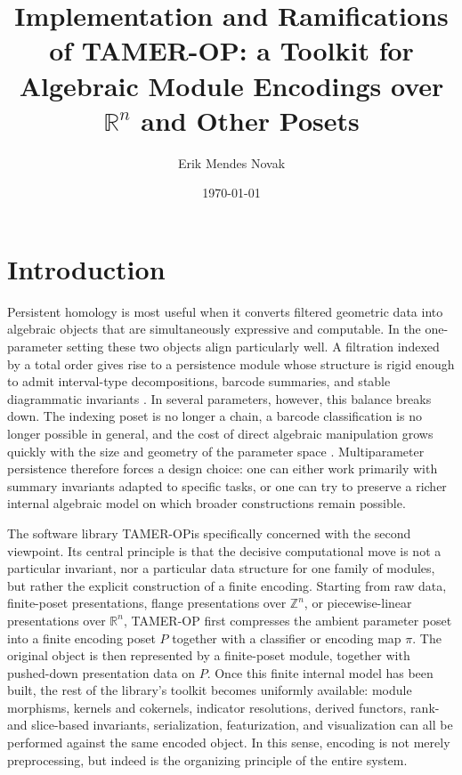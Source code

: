 \documentclass[11pt]{article}
\title{Implementation and Ramifications of TAMER-OP: a Toolkit for Algebraic Module Encodings over $\mathbb{R}^n$ and Other Posets}
\author{Erik Mendes Novak}
\date{\today}
\newcommand{\R}{\mathbb{R}}
\newcommand{\Z}{\mathbb{Z}}
\newcommand{\TAMER}{\textsc{TAMER-OP}}
\theoremstyle{definition}
\theoremstyle{remark}
\begin{document}
\maketitle
\tableofcontents



\section{Introduction}\label{sec:introduction}

Persistent homology is most useful when it converts filtered geometric data into algebraic objects that are simultaneously expressive and computable. In the one-parameter setting these two objects align particularly well. A filtration indexed by a total order gives rise to a persistence module whose structure is rigid enough to admit interval-type decompositions, barcode summaries, and stable diagrammatic invariants \cite{ELZ02,CEH07,CB15,EH10}. In several parameters, however, this balance breaks down. The indexing poset is no longer a chain, a barcode classification is no longer possible in general, and the cost of direct algebraic manipulation grows quickly with the size and geometry of the parameter space \cite{CZ09,Les15,CDSGO16,Oud15}. Multiparameter persistence therefore forces a design choice: one can either work primarily with summary invariants adapted to specific tasks, or one can try to preserve a richer internal algebraic model on which broader constructions remain possible.

The software library \TAMER is specifically concerned with the second viewpoint. Its central principle is that the decisive computational move is not a particular invariant, nor a particular data structure for one family of modules, but rather the explicit construction of a finite encoding. Starting from raw data, finite-poset presentations, flange presentations over $\Z^n$, or piecewise-linear presentations over $\R^n$, \TAMER{} first compresses the ambient parameter poset into a finite encoding poset $P$ together with a classifier or encoding map $\pi$. The original object is then represented by a finite-poset module, together with pushed-down presentation data on $P$. Once this finite internal model has been built, the rest of the library's toolkit becomes uniformly available: module morphisms, kernels and cokernels, indicator resolutions, derived functors, rank- and slice-based invariants, serialization, featurization, and visualization can all be performed against the same encoded object. In this sense, encoding is not merely preprocessing, but indeed is the organizing principle of the entire system.
\end{document}
